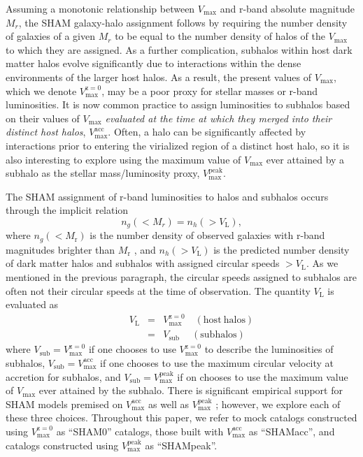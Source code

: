 \documentclass[usenatbib,usegraphicx,letterpaper]{mn2e}
\newcommand{\beq}{\begin{equation}}
\newcommand{\eeq}{\end{equation}}
\newcommand{\vpeak}{V_{\mathrm{max}}^{\mathrm{peak}}}
\newcommand{\vmax}{V_{\mathrm{max}}}
\newcommand{\vacc}{V_{\mathrm{max}}^{\mathrm{acc}}}
\newcommand{\vzero}{V_{\mathrm{max}}^{\mathrm{z=0}}}
\newcommand{\vsub}{V_{\mathrm{sub}}}
\newcommand{\vl}{V_{\mathrm{L}}}
\newcommand{\ngal}{n_{g}}
\newcommand{\nh}{n_{h}}
\newcommand{\mr}{M_{\mathrm{r}}}
\begin{document}
Assuming a monotonic relationship 
between $\vmax$ and r-band absolute magnitude $M_r$, the SHAM 
galaxy-halo assignment follows by requiring the number density of galaxies 
of a given $M_r$ to be equal to the number density of halos of the $\vmax$ 
to which they are assigned.  As a further complication, subhalos within 
host dark matter halos evolve significantly due to interactions within 
the dense environments of the larger host halos.  As a result, the present 
values of $\vmax$, which we denote $\vzero$, may be a poor proxy for stellar 
masses or r-band luminosities.  It is now common practice to assign luminosities 
to subhalos based on their values of $\vmax$ {\em evaluated at the time 
at which they merged into their distinct host halos}, $\vacc$.  Often, 
a halo can be significantly affected by interactions prior to entering 
the virialized region of a distinct host halo, so it is also interesting 
to explore using the maximum value of $\vmax$ ever attained by a subhalo 
as the stellar mass/luminosity proxy, $\vpeak$.  

The SHAM assignment of r-band luminosities to halos and subhalos occurs through 
the implicit relation 
%
\beq
\label{eq:lv}
\ngal(<M_r)=\nh(>\vl), 
\eeq
%
where $\ngal(<\mr)$ is the number density of observed galaxies with r-band 
magnitudes brighter than $\mr$ \citep{blanton_etal05}, 
and $\nh(>\vl)$ is the predicted number density of dark matter halos 
and subhalos with assigned circular speeds $>\vl$. 
As we mentioned in the previous paragraph, the circular speeds assigned 
to subhalos are often not their circular speeds at the time of 
observation.  The quantity $\vl$ is evaluated as 
%
\begin{eqnarray}
\label{eq:vassign}
\quad \quad \vl & = & \vzero \quad \mathrm{(host\ halos)} \nonumber \\
    & = & \vsub   \quad \ \mathrm{(subhalos)} \nonumber
\end{eqnarray}
%
where $\vsub=\vzero$ if one chooses to use $\vzero$ to describe 
the luminosities of subhalos, $\vsub=\vacc$ if one chooses to 
use the maximum circular velocity at accretion for subhalos, 
and $\vsub=\vpeak$ if on chooses to use the maximum value of 
$\vmax$ ever attained by the subhalo.  There is significant 
empirical support for SHAM models premised on 
$\vacc$ \cite[e.g.,][]{conroy_etal06} as well as $\vpeak$ \cite[e.g.,][]{reddick_etal12}; 
however, we explore each of these three choices. Throughout this paper, 
we refer to mock catalogs constructed using $\vzero$ 
as ``SHAM0'' catalogs, those built with $\vacc$ as ``SHAMacc'', 
and catalogs constructed using $\vpeak$ as ``SHAMpeak''.
\end{document}
